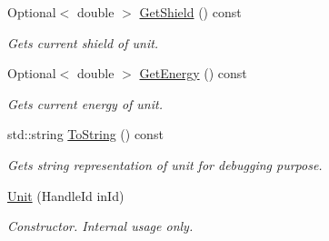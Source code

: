 \begin{DoxyCompactItemize}
Optional$<$ double $>$ \hyperlink{class_s_c2_a_p_i_1_1_unit_afe9fd89621459933c0e6563f8aace30e}{Get\+Shield} () const 
\begin{DoxyCompactList}\small\item\em Gets current shield of unit. \end{DoxyCompactList}\item 
Optional$<$ double $>$ \hyperlink{class_s_c2_a_p_i_1_1_unit_a5cd554713dca1acf5ddf3b178f6d62a0}{Get\+Energy} () const 
\begin{DoxyCompactList}\small\item\em Gets current energy of unit. \end{DoxyCompactList}\item 
std\+::string \hyperlink{class_s_c2_a_p_i_1_1_unit_a6428d9cfc5d7bc7a7260c468d296adc4}{To\+String} () const 
\begin{DoxyCompactList}\small\item\em Gets string representation of unit for debugging purpose. \end{DoxyCompactList}\item 
\hyperlink{class_s_c2_a_p_i_1_1_unit_a58ae87242b7df40f0f530d931fbc4006}{Unit} (Handle\+Id in\+Id)
\begin{DoxyCompactList}\small\item\em Constructor. Internal usage only. \end{DoxyCompactList}\end{DoxyCompactItemize}
